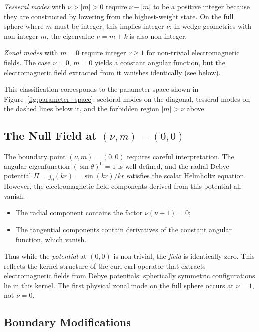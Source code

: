 \documentclass[
  aip,
  amsmath,amssymb,
  preprint
]{revtex4-1}
\begin{document}
\noindent \textit{Tesseral modes} with $\nu > |m| > 0$ require $\nu - |m|$ to be a positive integer because they are constructed by lowering from the highest-weight state. On the full sphere where $m$ must be integer, this implies integer $\nu$; in wedge 
geometries with non-integer $m$, the eigenvalue $\nu = m + k$ is also non-integer.

\noindent \textit{Zonal modes} with $m = 0$ require integer $\nu \geq 1$ for non-trivial electromagnetic fields. The case $\nu = 0$, $m = 0$ yields a constant angular function, but the electromagnetic field extracted from it vanishes identically (see below).

This classification corresponds to the parameter space shown in 
Figure~\ref{fig:parameter_space}: sectoral modes on the diagonal, 
tesseral modes on the dashed lines below it, and the forbidden 
region $|m| > \nu$ above.

\subsection{The Null Field at $(\nu, m) = (0, 0)$}
The boundary point $(\nu, m) = (0, 0)$ requires careful interpretation. The angular eigenfunction $(\sin\theta)^0 = 1$ is well-defined, and the radial Debye potential $\Pi = j_0(kr) = \sin(kr)/kr$ satisfies the scalar Helmholtz equation. However, the electromagnetic field components derived from this potential all vanish:
\begin{itemize}
\item The radial component contains the factor $\nu(\nu+1) = 0$;
\item The tangential components contain derivatives of the constant angular function, 
which vanish.
\end{itemize}
Thus while the \emph{potential} at $(0,0)$ is non-trivial, the \emph{field} is identically zero. This reflects the kernel structure of the curl-curl operator that extracts electromagnetic fields from Debye potentials: spherically symmetric configurations lie in this kernel. The first physical zonal mode on the full sphere occurs at $\nu = 1$, not $\nu = 0$.

\subsection{Boundary Modifications}
\end{document}
